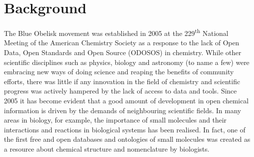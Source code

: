 \documentclass[10pt]{bmc_article}
\newenvironment{bmcformat}{\fussy\setboolean{publ}{true}}{\fussy}
\begin{document}
\begin{bmcformat}








\section*{Background}
The Blue Obelisk movement was established in 2005 at the
229\textsuperscript{th} National Meeting of the American Chemistry
Society as a response to the lack of Open Data, Open Standards and
Open Source (ODOSOS) in chemistry. While other scientific disciplines
such as physics, biology and astronomy (to name a few) were embracing
new ways of doing science and reaping the benefits of community
efforts, there was little if any innovation in the field of chemistry
and scientific progress was actively hampered by the lack of access to
data and tools.
Since 2005 it has become evident that a good amount of development in open
chemical information is driven by the demands of neighbouring
scientific fields. In many areas in biology, for example, the importance of
small molecules and their interactions and reactions in biological systems
has been realised. In fact, one of the first free and open databases and ontologies
of small molecules was created as a resource about chemical structure and nomenclature
by biologists.\cite{DeMatos:2009p3839}


\end{bmcformat}
\end{document}
